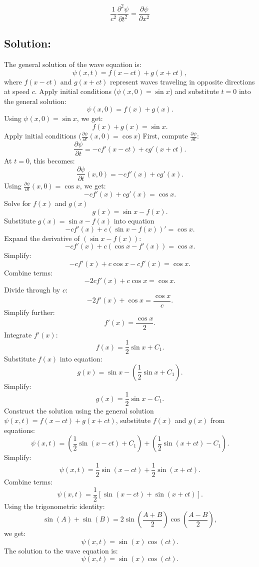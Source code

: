 \documentclass[12pt]{article}
\begin{document}
    \begin{equation} \label{eq: 9.89}
        \frac{1}{c^2} \frac{\partial^2 \psi}{\partial t^2} = \frac{\partial \psi}{\partial x^2}
    \end{equation}
    \subsection*{Solution:}
        The general solution of the wave equation is:
        \[
        \psi(x, t) = f(x - ct) + g(x + ct),
        \]
        where \(f(x - ct)\) and \(g(x + ct)\) represent waves traveling in opposite directions at speed \(c\).
        Apply initial conditions (\(\psi(x, 0) = \sin x\)) and substitute \(t = 0\) into the general solution:
        \[
        \psi(x, 0) = f(x) + g(x).
        \]
        Using \(\psi(x, 0) = \sin x\), we get:
        \[
        f(x) + g(x) = \sin x. \tag{1}
        \]
        Apply initial conditions (\(\frac{\partial \psi}{\partial t}(x, 0) = \cos x\))
        First, compute \(\frac{\partial \psi}{\partial t}\):
        \[
        \frac{\partial \psi}{\partial t} = -c f'(x - ct) + c g'(x + ct).
        \]
        At \(t = 0\), this becomes:
        \[
        \frac{\partial \psi}{\partial t}(x, 0) = -c f'(x) + c g'(x).
        \]
        Using \(\frac{\partial \psi}{\partial t}(x, 0) = \cos x\), we get:
        \[
        -c f'(x) + c g'(x) = \cos x.
        \]
        Solve for \(f(x)\) and \(g(x)\)
        \[
        g(x) = \sin x - f(x).
        \]
        Substitute \(g(x) = \sin x - f(x)\) into equation
        \[
        -c f'(x) + c (\sin x - f(x))' = \cos x.
        \]
        Expand the derivative of \((\sin x - f(x))\):
        \[
        -c f'(x) + c (\cos x - f'(x)) = \cos x.
        \]
        Simplify:
        \[
        -c f'(x) + c \cos x - c f'(x) = \cos x.
        \]
        Combine terms:
        \[
        -2c f'(x) + c \cos x = \cos x.
        \]
        Divide through by \(c\):
        \[
        -2 f'(x) + \cos x = \frac{\cos x}{c}.
        \]
        Simplify further:
        \[
        f'(x) = \frac{\cos x}{2}.
        \]
        Integrate \(f'(x)\):
        \[
        f(x) = \frac{1}{2} \sin x + C_1.
        \]
        Substitute \(f(x)\) into equation:
        \[
        g(x) = \sin x - \left(\frac{1}{2} \sin x + C_1\right).
        \]
        Simplify:
        \[
        g(x) = \frac{1}{2} \sin x - C_1.
        \]
        Construct the solution using the general solution \(\psi(x, t) = f(x - ct) + g(x + ct)\), substitute \(f(x)\) and \(g(x)\) from equations:
        \[
        \psi(x, t) = \left(\frac{1}{2} \sin(x - ct) + C_1\right) + \left(\frac{1}{2} \sin(x + ct) - C_1\right).
        \]
        Simplify:
        \[
        \psi(x, t) = \frac{1}{2} \sin(x - ct) + \frac{1}{2} \sin(x + ct).
        \]
        Combine terms:
        \[
        \psi(x, t) = \frac{1}{2} \left[\sin(x - ct) + \sin(x + ct)\right].
        \]
        Using the trigonometric identity:
        \[
        \sin(A) + \sin(B) = 2 \sin\left(\frac{A + B}{2}\right) \cos\left(\frac{A - B}{2}\right),
        \]
        we get:
        \[
        \psi(x, t) = \sin(x) \cos(ct).
        \]
        The solution to the wave equation is:
        \[
        \boxed{\psi(x, t) = \sin(x) \cos(ct).}
        \]
\end{document}
